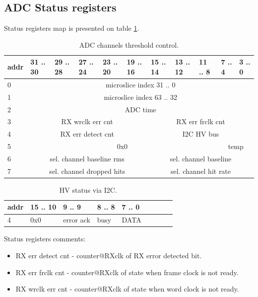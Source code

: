 \documentclass{article}
\begin{document}
\subsection{ADC Status registers}

Status registers map is presented on table \ref{tab8}. 

\begin{table}[H]
\centering
\begin{tabular}{| l | l | l | l | l | l | l | l | l | l | l |}
\hline
addr & 31 .. 30 & 29 .. 28 & 27 .. 24 & 23 .. 20 & 19 .. 16 & 15 .. 14 & 13 .. 12 & 11 .. 8 & 7 .. 4 & 3 .. 0 \\ \hline
0 & \multicolumn{10}{c|}{microslice index 31 .. 0}\\ \hline
1 & \multicolumn{10}{c|}{microslice index 63 .. 32}\\ \hline
2 & \multicolumn{10}{c|}{ADC time}\\ \hline
3 & \multicolumn{5}{c|}{RX wrclk err cnt} & \multicolumn{5}{c|}{RX err frclk cnt} \\ \hline
4 & \multicolumn{5}{c|}{RX err detect cnt} & \multicolumn{5}{c|}{I2C HV bus}\\ \hline
5 & \multicolumn{8}{c|}{0x0} & \multicolumn{2}{c|}{temp} \\ \hline
6 & \multicolumn{5}{c|}{sel. channel baseline rms} & \multicolumn{5}{c|}{sel. channel baseline}\\ \hline
7 & \multicolumn{5}{c|}{sel. channel dropped hits} & \multicolumn{5}{c|}{sel. channel hit rate}\\ \hline
\end{tabular}
\caption{ADC channels threshold control.\label{tab8}}
\end{table}

\begin{table}[H]
\centering
\begin{tabular}{| l | l | l | l | l | l | l | l | l |}
\hline
addr & 15 .. 10 & 9 .. 9 & 8 .. 8 & 7 .. 0 \\ \hline
4 & 0x0 & error ack & busy & DATA \\ \hline
\end{tabular}
\caption{HV status via I2C.\label{tab9}}
\end{table}

Status registers comments:
\begin{itemize}
\item RX err detect cnt - counter@RXclk of RX error detected bit.

\item RX err frclk cnt - counter@RXclk of state when frame clock is not ready.

\item RX wrclk err cnt - counter@RXclk of state when word clock is not ready.
\end{itemize}
\end{document}
